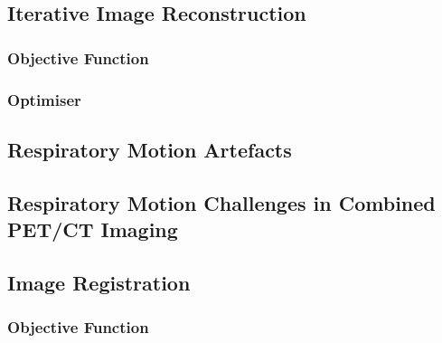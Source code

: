         \subsection{Iterative Image Reconstruction} \label{iterative_image_reconstruction}
            \blindtext
            
            \subsubsection{Objective Function} \label{iterative_image_reconstruction_objective_function}
                \blindtext
                
            \subsubsection{Optimiser} \label{iterative_image_reconstruction_optimiser}
                \blindtext
    
        \blindtext
        
        \subsection{Respiratory Motion Artefacts} \label{respiratory_motion_artefacts}
            \blindtext
            
        \subsection{Respiratory Motion Challenges in Combined PET/CT Imaging} \label{respiratory_motion_challenges_in_combined_pet_ct_imaging}
            \blindtext
    
        \blindtext
    
        \subsection{Image Registration} \label{image_registration}
            \blindtext
            
            \subsubsection{Objective Function} \label{image_registration_objective_function}
                \blindtext
                
